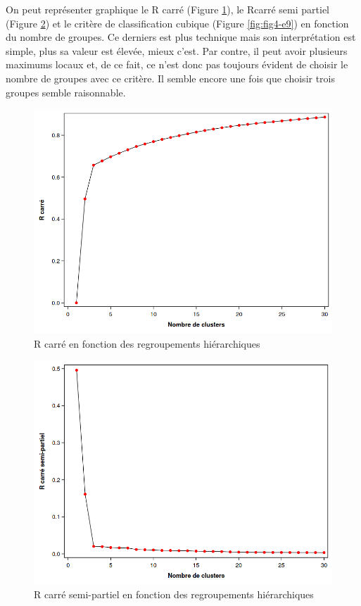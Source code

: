 \documentclass[
  11pt,
  letterpaper,
]{book}
\theoremstyle{definition}
\theoremstyle{definition}
\theoremstyle{definition}
\theoremstyle{remark}
\begin{document}
On peut représenter graphique le R carré (Figure \ref{fig:fig4-e7}), le Rcarré semi partiel (Figure \ref{fig:fig4-e8}) et le critère de classification cubique (Figure \ref{fig:fig4-e9}) en fonction du nombre de groupes. Ce derniers est plus technique mais son interprétation est simple, plus sa valeur est élevée, mieux c'est. Par contre, il peut avoir plusieurs maximums locaux et, de ce fait, ce n'est donc pas toujours évident de choisir le nombre de groupes avec ce critère. Il semble encore une fois que choisir trois groupes semble raisonnable.

\begin{figure}

{\centering \includegraphics[width=0.8\linewidth]{figures/04-clustering-e8} 

}

\caption{R carré en fonction des regroupements hiérarchiques}\label{fig:fig4-e7}
\end{figure}

\begin{figure}

{\centering \includegraphics[width=0.8\linewidth]{figures/04-clustering-e9} 

}

\caption{R carré semi-partiel en fonction des regroupements hiérarchiques}\label{fig:fig4-e8}
\end{figure}
\end{document}
